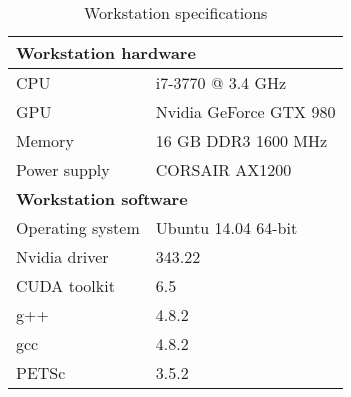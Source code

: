 \begin{table}[h]
	\begin{center}
	\begin{tabular}{|l|l|}
		\hline
		\multicolumn{2}{|l|}{\textbf{Workstation hardware}} \\ \hline
		CPU & i7-3770 @ 3.4 GHz \\ \hline
		GPU & Nvidia GeForce GTX 980 \\ \hline
		Memory & 16 GB DDR3 1600 MHz \\ \hline
		Power supply & CORSAIR AX1200 \\ \hline
		\multicolumn{2}{|l|}{\textbf{Workstation software}} \\ \hline
		Operating system & Ubuntu 14.04 64-bit \\ \hline
		Nvidia driver & 343.22 \\ \hline
		CUDA toolkit & 6.5 \\ \hline
		g++ & 4.8.2 \\ \hline
		gcc & 4.8.2 \\ \hline
		PETSc & 3.5.2 \\ \hline
	\end{tabular}
	\end{center}
	\caption{Workstation specifications}
	\label{table:workstation}
\end{table}
